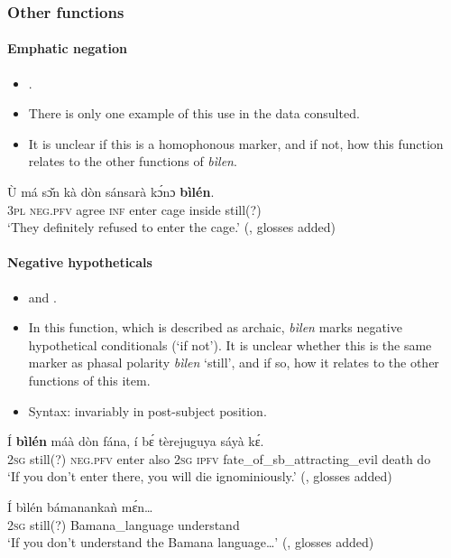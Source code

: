 \subsubsection{Other functions}
\paragraph{Emphatic negation}
\begin{itemize}
	\item \textcite[123]{Vydrine2015}.
	\item There is only one example of this use in the data consulted.
	\item It is unclear if this is a homophonous marker, and if not, how this function relates to the other functions of \textit{bìlen}.
\end{itemize}

\begin{exe}
	\ex
	\gll  Ù má sɔ̌n kà dòn sánsarà kɔ́nɔ \textbf{bìlén}.\\
	3\textsc{pl} \textsc{neg}.\textsc{pfv} agree \textsc{inf} enter cage inside still(?)\\
	\glt \lq They definitely refused to enter the cage.\rq{ }(\cite[123]{Vydrine2015}, glosses added)
\end{exe}

\paragraph{Negative hypotheticals}
\begin{itemize}
	\item \textcite[311]{Dumestre2003} and \textcite[123]{Vydrine2015}.
	\item In this function, which is described as archaic, \textit{bìlen} marks negative hypothetical conditionals (\lq if not'). It is unclear whether this is the same marker as phasal polarity \textit{bìlen} \lq still', and if so, how it relates to the other functions of this item.
	\item Syntax: invariably in post-subject position.
\end{itemize}

\begin{exe}
	\ex
	\gll Í \textbf{bìlén} máà dòn fána, í bɛ́ tèrejuguya sáyà kɛ́.\\
	2\textsc{sg} still(?) \textsc{neg}.\textsc{pfv} enter also 2\textsc{sg} \textsc{ipfv} fate\_of\_sb\_attracting\_evil death do\\
	\glt \lq If you don't enter there, you will die ignominiously.\rq{ }(\cite[123]{Vydrine2015}, glosses added)
	
	\ex
	\gll Í bìlén bámanankaǹ mɛ́n…\\
	2\textsc{sg} still(?) Bamana\_language understand\\
	\glt \lq If you don't understand the Bamana language…\rq{ }(\cite[123]{Vydrine2015}, glosses added)
\end{exe}

